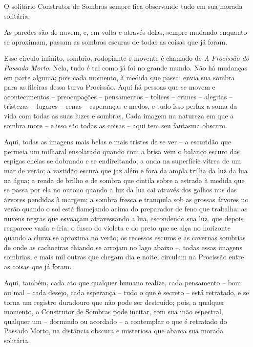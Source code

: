  

O solitário Construtor de Sombras sempre fica observando tudo em sua morada
solitária.

As paredes são de nuvem, e, em volta e através delas, sempre mudando
enquanto se aproximam, passam as sombras escuras de todas as coisas que já foram.

Esse círculo infinito, sombrio, rodopiante e movente é chamado de
\emph{A Procissão do Passado Morto}. Nela, tudo é tal como já foi no
grande mundo. Não há mudanças em parte alguma; pois cada momento, à
medida que passa, envia sua sombra para as fileiras dessa turva
Procissão. Aqui há pessoas que se movem e acontecimentos -- preocupações --
pensamentos -- tolices -- crimes -- alegrias -- tristezas -- lugares --
cenas -- esperanças e medos, e tudo isso perfaz a soma da vida com todas as
suas luzes e sombras. Cada imagem na natureza em que a sombra more -- e
isso são todas as coisas -- aqui tem seu fantasma obscuro.



Aqui, todas as imagens mais belas e mais tristes de se ver -- a
escuridão que permeia um milharal ensolarado quando com a brisa vem o
balanço escuro das espigas cheias se dobrando e se endireitando; a onda na
superfície vítrea de um mar de verão; a vastidão escura que jaz além e
fora da ampla trilha da luz da lua na água; a renda de brilho e de
sombra que cintila sobre a estrada à medida que se passa por ela no
outono quando a luz da lua cai através dos galhos nus das árvores
pendidas à margem; a sombra fresca e tranquila sob as grossas árvores no
verão quando o sol está flamejando acima do preparador de feno que
trabalha; as nuvens negras que esvoaçam atravessando a lua, escondendo
sua luz, que depois reaparece vazia e fria; o fusco do violeta e do
preto que se alça no horizonte quando a chuva se aproxima no verão; os
recessos escuros e as cavernas sombrias de onde as cachoeiras chiando
se arrojam no lago abaixo --, todas essas imagens sombrias, e mais mil
outras que chegam dia e noite, circulam na Procissão entre as coisas que já
foram.

Aqui, também, cada ato que qualquer humano realize, cada pensamento --
bom ou mal -- cada desejo, cada esperança -- tudo o que é secreto --
está retratado, e se torna um registro duradouro que não pode ser
destruído; pois, a qualquer momento, o Construtor de Sombras pode
incitar, com sua mão espectral, qualquer um -- dormindo ou acordado -- a
contemplar o que é retratado do Passado Morto, na distância obscura e
misteriosa que abarca sua morada solitária.

